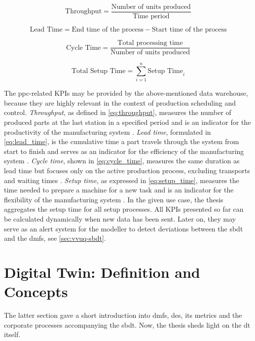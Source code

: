 \begin{equation}
    \text{Throughput} = \frac{\text{Number of units produced}}{\text{Time period}}
    \label{eq:throughput}
\end{equation}

\begin{equation}
    \text{Lead Time} = \text{End time of the process} - \text{Start time of the process}
    \label{eq:lead_time}
\end{equation}

\begin{equation}
    \text{Cycle Time} = \frac{\text{Total processing time}}{\text{Number of units produced}}
    \label{eq:cycle_time}
\end{equation}

\begin{equation}
    \text{Total Setup Time} = \sum_{i=1}^{n} \text{Setup Time}_i
    \label{eq:setup_time}
\end{equation}

The \gls{ppc}-related KPIs may be provided by the above-mentioned data warehouse, because they are highly relevant in the context of production scheduling and control. \textit{Throughput}, as defined in \autoref{eq:throughput}, measures the number of produced parts at the last station in a specified period and is an indicator for the productivity of the manufacturing system \autocite{hopp2011factory, imseitif2019throughput}. \textit{Lead time}, formulated in \autoref{eq:lead_time}, is the cumulative time a part travels through the system from start to finish and serves as an indicator for the efficiency of the manufacturing system \autocite{slack2010operations, pfeiffer2016manufacturing}. \textit{Cycle time}, shown in \autoref{eq:cycle_time}, measures the same duration as lead time but focuses only on the active production process, excluding transports and waiting times \autocite{goldratt2004goal, griffin1993metrics}. \textit{Setup time}, as expressed in \autoref{eq:setup_time}, measures the time needed to prepare a machine for a new task and is an indicator for the flexibility of the manufacturing system \autocite{allahverdi1999review, allahverdi2008significance}. In the given use case, the thesis aggregates the setup time for all setup processes. All KPIs presented so far can be calculated dynamically when new data has been sent. Later on, they may serve as an alert system for the modeller to detect deviations between the \gls{sbdt} and the \gls{dmfs}, see \autoref{sec:vvuq-sbdt}.

\section{Digital Twin: Definition and Concepts}
\label{sec:digital-twin}
The latter section gave a short introduction into \gls{dmfs}, \gls{des}, its metrics and the corporate processes accompanying the \gls{sbdt}. Now, the thesis sheds light on the \gls{dt} itself.

